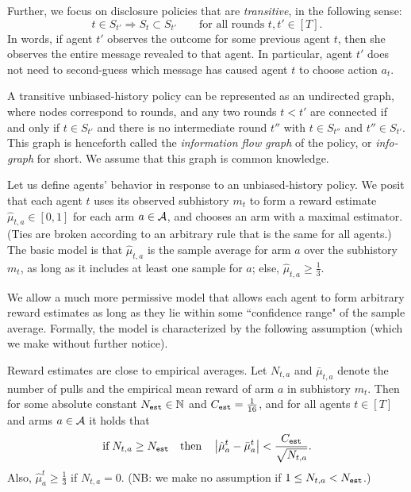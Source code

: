 Further, we focus on disclosure policies that are \emph{transitive}, in the following sense:
\[ t\in S_{t'} \Rightarrow S_t\subset S_{t'}
    \qquad \text{for all rounds $t,t'\in [T]$}. \]
In words, if agent $t'$ observes the outcome for some previous agent $t$, then she observes the entire message revealed to that agent. In particular, agent $t'$ does not need to second-guess which message has caused agent $t$ to choose action $a_t$.

A transitive unbiased-history policy can be represented as an undirected graph, where nodes correspond to rounds, and any two rounds $t<t'$ are connected if and only if $t\in S_{t'}$ and there is no intermediate round $t''$ with
    $t\in S_{t''}$ and $t''\in S_{t'}$.
This graph is henceforth called the \emph{information flow graph} of the policy, or \emph{info-graph} for short. We assume that this graph is common knowledge.

 Let us define agents' behavior in response to an unbiased-history policy. We posit that each agent $t$ uses its observed subhistory $m_t$ to form a reward estimate $\hat{\mu}_{t,a} \in [0,1]$ for each arm $a\in \mathcal{A}$, and chooses an arm with a maximal estimator. (Ties are broken according to an arbitrary rule that is the same for all agents.) The basic model is that $\hat{\mu}_{t,a}$ is the sample average for arm $a$ over the subhistory $m_t$, as long as it includes at least one sample for $a$; else, $\hat{\mu}_{t,a}\geq \tfrac13$.

We allow a much more permissive model that allows each agent to form arbitrary reward estimates as long as they lie within some ``confidence range" of the sample average. Formally, the model is characterized by the following assumption (which we make without further notice).


\begin{assumption}\label{ass:embehave}
Reward estimates are close to empirical averages. Let $N_{t,a}$ and $\bar{\mu}_{t,a}$ denote the number of pulls and the empirical mean reward of arm $a$ in subhistory $m_t$. Then for some absolute constant $N_{\mathtt{est}}\in \mathbb{N}$ and $C_{\mathtt{est}}=\tfrac{1}{16}$, and for all agents $t\in [T]$ and arms $a\in\mathcal{A}$ it holds that
\[
\text{if}\; N_{t,a} \geq N_{\mathtt{est}}
\quad\text{then}\quad
    \left|\hat{\mu}^t_a - \bar{\mu}^t_a \right| <
		\frac{C_{\mathtt{est}}}{\sqrt{N_{t,a}}}.
\]
Also,
    $\hat{\mu}^t_a\geq\tfrac13$ if $N_{t,a}=0$.
(NB: we make no assumption if $1\leq N_{t,a}<N_{\mathtt{est}}$.)
\end{assumption}

